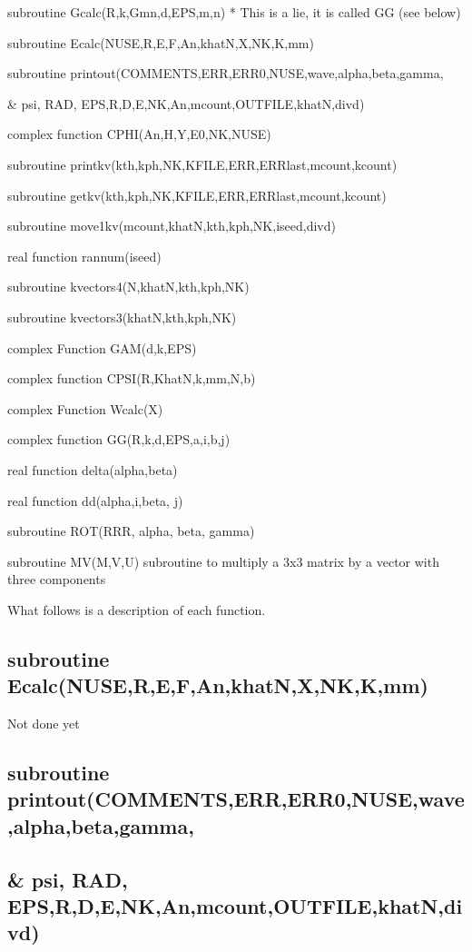 \documentclass{article}
\begin{document}
subroutine Gcalc(R,k,Gmn,d,EPS,m,n) * This is a lie, it is called GG (see
below)

subroutine Ecalc(NUSE,R,E,F,An,khatN,X,NK,K,mm) 

subroutine printout(COMMENTS,ERR,ERR0,NUSE,wave,alpha,beta,gamma,

\& psi, RAD, EPS,R,D,E,NK,An,mcount,OUTFILE,khatN,divd) 

complex function CPHI(An,H,Y,E0,NK,NUSE)

subroutine printkv(kth,kph,NK,KFILE,ERR,ERRlast,mcount,kcount) 

subroutine getkv(kth,kph,NK,KFILE,ERR,ERRlast,mcount,kcount) 

subroutine move1kv(mcount,khatN,kth,kph,NK,iseed,divd) 

real function rannum(iseed)

subroutine kvectors4(N,khatN,kth,kph,NK) 

subroutine kvectors3(khatN,kth,kph,NK)

complex Function GAM(d,k,EPS)

complex function CPSI(R,KhatN,k,mm,N,b) 

complex Function Wcalc(X) 

complex function GG(R,k,d,EPS,a,i,b,j) 

real function delta(alpha,beta)

real function dd(alpha,i,beta, j) 

subroutine ROT(RRR, alpha, beta, gamma)

subroutine MV(M,V,U) subroutine to multiply a 3x3 matrix by a vector with
three components

What follows is a description of each function.

\subsection{subroutine Ecalc(NUSE,R,E,F,An,khatN,X,NK,K,mm) }

Not done yet

\subsection{subroutine printout(COMMENTS,ERR,ERR0,NUSE,wave,alpha,beta,gamma,%
}

\subsection{ \& psi, RAD, EPS,R,D,E,NK,An,mcount,OUTFILE,khatN,divd) }
\end{document}
